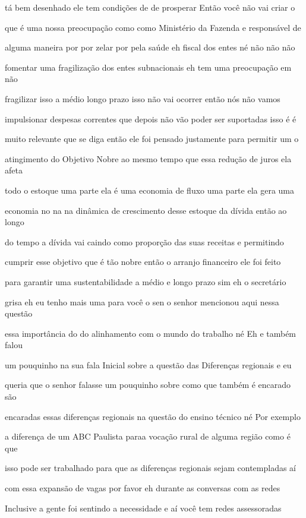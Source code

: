 \documentclass[a4paper,12pt]{article}
\begin{document}
tá bem desenhado ele tem condições de de prosperar Então você não vai criar o

que é uma nossa preocupação como como Ministério da Fazenda e responsável de

alguma maneira por por zelar por pela saúde eh fiscal dos entes né não não não

fomentar uma fragilização dos entes subnacionais eh tem uma preocupação em não

fragilizar isso a médio longo prazo isso não vai ocorrer então nós não vamos

impulsionar despesas correntes que depois não vão poder ser suportadas isso é é

muito relevante que se diga então ele foi pensado justamente para permitir um o

atingimento do Objetivo Nobre ao mesmo tempo que essa redução de juros ela afeta

todo o estoque uma parte ela é uma economia de fluxo uma parte ela gera uma

economia no na na dinâmica de crescimento desse estoque da dívida então ao longo

do tempo a dívida vai caindo como proporção das suas receitas e permitindo

cumprir esse objetivo que é tão nobre então o arranjo financeiro ele foi feito

para garantir uma sustentabilidade a médio e longo prazo sim eh o secretário

grisa eh eu tenho mais uma para você o sen o senhor mencionou aqui nessa questão

essa importância do do alinhamento com o mundo do trabalho né Eh e também falou

um pouquinho na sua fala Inicial sobre a questão das Diferenças regionais e eu

queria que o senhor falasse um pouquinho sobre como que também é encarado são

encaradas essas diferenças regionais na questão do ensino técnico né Por exemplo

a diferença de um ABC Paulista paraa vocação rural de alguma região como é que

isso pode ser trabalhado para que as diferenças regionais sejam contempladas aí

com essa expansão de vagas por favor eh durante as conversas com as redes

Inclusive a gente foi sentindo a necessidade e aí você tem redes assessoradas
\end{document}

